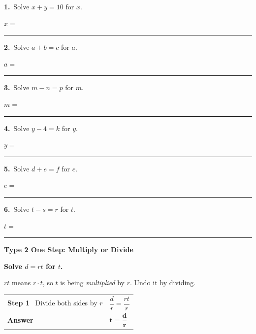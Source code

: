 \documentclass[11pt,letterpaper]{article}
\newcommand{\topicbar}[1]{\needspace{4.5cm}\par\vspace{5mm}
  \begin{tcolorbox}[enhanced,colback=fmtitle,colframe=fmtitle,arc=2mm,left=4mm,top=1.5mm,bottom=1.5mm]
  \color{white}\bfseries\large #1
  \end{tcolorbox}}
\begin{document}
\needspace{3.5cm}\par\vspace{3mm}\noindent \begin{minipage}[t][3.0cm]{0.48\linewidth}\raggedright{\color{fmturn}\bfseries 1.}\ Solve $x + y = 10$ for $x$.\par\vfill\hfill $x = $\ \rule{3.2cm}{0.4pt}\end{minipage}\hfill \begin{minipage}[t][3.0cm]{0.48\linewidth}\raggedright{\color{fmturn}\bfseries 2.}\ Solve $a + b = c$ for $a$.\par\vfill\hfill $a = $\ \rule{3.2cm}{0.4pt}\end{minipage}\par
\needspace{3.5cm}\par\vspace{3mm}\noindent \begin{minipage}[t][3.0cm]{0.48\linewidth}\raggedright{\color{fmturn}\bfseries 3.}\ Solve $m - n = p$ for $m$.\par\vfill\hfill $m = $\ \rule{3.2cm}{0.4pt}\end{minipage}\hfill \begin{minipage}[t][3.0cm]{0.48\linewidth}\raggedright{\color{fmturn}\bfseries 4.}\ Solve $y - 4 = k$ for $y$.\par\vfill\hfill $y = $\ \rule{3.2cm}{0.4pt}\end{minipage}\par
\needspace{3.5cm}\par\vspace{3mm}\noindent \begin{minipage}[t][3.0cm]{0.48\linewidth}\raggedright{\color{fmturn}\bfseries 5.}\ Solve $d + e = f$ for $e$.\par\vfill\hfill $e = $\ \rule{3.2cm}{0.4pt}\end{minipage}\hfill \begin{minipage}[t][3.0cm]{0.48\linewidth}\raggedright{\color{fmturn}\bfseries 6.}\ Solve $t - s = r$ for $t$.\par\vfill\hfill $t = $\ \rule{3.2cm}{0.4pt}\end{minipage}\par
\needspace{9cm}\topicbar{Type 2 \quad One Step: Multiply or Divide}
\begin{watchme}\textbf{Solve $d = rt$ for $t$.}\par\vspace{1mm}
$rt$ means $r \cdot t$, so $t$ is being \emph{multiplied} by $r$. Undo it by dividing.\par\vspace{1mm}
\renewcommand{\arraystretch}{2.1}\begin{tabular}{@{}l l@{}}
\textbf{Step 1} \ Divide both sides by $r$ & $\dfrac{d}{r} = \dfrac{rt}{r}$\\
\textbf{Answer} & $\boldsymbol{t = \dfrac{d}{r}}$
\end{tabular}\end{watchme}
\end{document}
